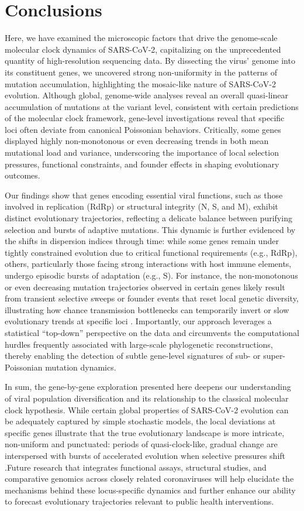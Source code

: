\section{Conclusions}
Here, we have examined the microscopic factors that drive the genome-scale molecular clock dynamics of SARS-CoV-2, capitalizing on the unprecedented quantity of high-resolution sequencing data. By dissecting the virus' genome into its constituent genes, we uncovered strong non-uniformity in the patterns of mutation accumulation, highlighting the mosaic-like nature of SARS-CoV-2 evolution. Although global, genome-wide analyses reveal an overall quasi-linear accumulation of mutations at the variant level, consistent with certain predictions of the molecular clock framework, gene-level investigations reveal that specific loci often deviate from canonical Poissonian behaviors. Critically, some genes displayed highly non-monotonous or even decreasing trends in both mean mutational load and variance, underscoring the importance of local selection pressures, functional constraints, and founder effects in shaping evolutionary outcomes.

Our findings show that genes encoding essential viral functions, such as those involved in replication (RdRp) or structural integrity (N, S, and M), exhibit distinct evolutionary trajectories, reflecting a delicate balance between purifying selection and bursts of adaptive mutations. This dynamic is further evidenced by the shifts in dispersion indices through time: while some genes remain under tightly constrained evolution due to critical functional requirements (e.g., RdRp), others, particularly those facing strong interactions with host immune elements, undergo episodic bursts of adaptation (e.g., S). For instance, the non-monotonous or even decreasing mutation trajectories observed in certain genes likely result from transient selective sweeps or founder events that reset local genetic diversity, illustrating how chance transmission bottlenecks can temporarily invert or slow evolutionary trends at specific loci \cite{markov2023evolution}. Importantly, our approach leverages a statistical “top-down” perspective on the data and circumvents the computational hurdles frequently associated with large-scale phylogenetic reconstructions, thereby enabling the detection of subtle gene-level signatures of sub- or super-Poissonian mutation dynamics.

In sum, the gene-by-gene exploration presented here deepens our understanding of viral population diversification and its relationship to the classical molecular clock hypothesis. While certain global properties of SARS-CoV-2 evolution can be adequately captured by simple stochastic models, the local deviations at specific genes illustrate that the true evolutionary landscape is more intricate, non-uniform and punctuated: periods of quasi-clock-like, gradual change are interspersed with bursts of accelerated evolution when selective pressures shift \cite{tay2022}.Future research that integrates functional assays, structural studies, and comparative genomics across closely related coronaviruses will help elucidate the mechanisms behind these locus-specific dynamics and further enhance our ability to forecast evolutionary trajectories relevant to public health interventions.
